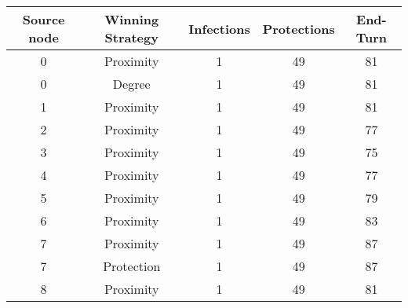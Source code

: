 \documentclass[results.tex]{subfiles}
\begin{document}
    \begin{center}
        \begin{tabular}{| c || c | c | c | c |}
            \hline
            {\bfseries Source node} & {\bfseries Winning Strategy} & {\bfseries Infections} & {\bfseries Protections}
            & {\bfseries End-Turn}
            \\  %
            \hline\hline
            0                       & Proximity                    & 1                      & 49                      & 81                   \\
            \hline
            0                       & Degree                       & 1                      & 49                      & 81                   \\
            \hline
            1                       & Proximity                    & 1                      & 49                      & 81                   \\
            \hline
            2                       & Proximity                    & 1                      & 49                      & 77                   \\
            \hline
            3                       & Proximity                    & 1                      & 49                      & 75                   \\
            \hline
            4                       & Proximity                    & 1                      & 49                      & 77                   \\
            \hline
            5                       & Proximity                    & 1                      & 49                      & 79                   \\
            \hline
            6                       & Proximity                    & 1                      & 49                      & 83                   \\
            \hline
            7                       & Proximity                    & 1                      & 49                      & 87                   \\
            \hline
            7                       & Protection                   & 1                      & 49                      & 87                   \\
            \hline
            8                       & Proximity                    & 1                      & 49                      & 81                   \\

\end{tabular}
\end{center}
\end{document}
